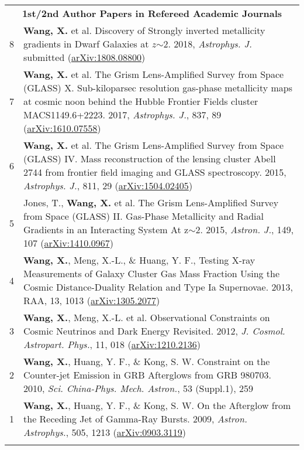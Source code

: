 \documentclass[letterpaper,12pt]{article}
\begin{document}
\begingroup
\renewcommand\arraystretch{1.2}
\vspace*{-.5em}
\begin{longtable}{rp{5.8in}}

\multicolumn{2}{c}{\textbf{1st/2nd Author Papers in Refereed Academic Journals}}      \\

8 &  \textbf{Wang, X.} et al. Discovery of Strongly inverted metallicity gradients in Dwarf Galaxies at $z$$\sim$2. 2018, \textit{Astrophys. J.} submitted (\href{https://arxiv.org/abs/1808.08800}{arXiv:1808.08800})  \\
7 &  \textbf{Wang, X.} et al. The Grism Lens-Amplified Survey from Space (GLASS) X. Sub-kiloparsec resolution gas-phase metallicity maps at cosmic noon behind the Hubble Frontier Fields cluster MACS1149.6+2223. 2017, \textit{Astrophys. J.}, 837, 89 (\href{http://arxiv.org/abs/1610.07558}{arXiv:1610.07558})     \\
6 &  \textbf{Wang, X.} et al. The Grism Lens-Amplified Survey from Space (GLASS) IV. Mass reconstruction of the lensing cluster Abell 2744 from frontier field imaging and GLASS spectroscopy. 2015, \textit{Astrophys. J.}, 811, 29 (\href{http://arxiv.org/abs/1504.02405}{arXiv:1504.02405})  \\
5 &  Jones, T., \textbf{Wang, X.} et al. The Grism Lens-Amplified Survey from Space (GLASS) II. Gas-Phase Metallicity and Radial Gradients in an Interacting System At z$\sim$2. 2015, \textit{Astron. J.}, 149, 107 (\href{http://arxiv.org/abs/1410.0967}{arXiv:1410.0967})    \\
4 &  \textbf{Wang, X.}, Meng, X.-L., \& Huang, Y. F., Testing X-ray Measurements of Galaxy Cluster Gas Mass Fraction Using the Cosmic Distance-Duality Relation and Type Ia Supernovae. 2013, RAA, 13, 1013 (\href{http://arxiv.org/abs/1305.2077}{arXiv:1305.2077})  \\
3 &  \textbf{Wang, X.}, Meng, X.-L. et al. Observational Constraints on Cosmic Neutrinos and Dark Energy Revisited. 2012, \textit{J. Cosmol. Astropart. Phys.}, 11, 018 (\href{http://arxiv.org/abs/1210.2136}{arXiv:1210.2136})  \\
2 &  \textbf{Wang, X.}, Huang, Y. F., \& Kong, S. W. Constraint on the Counter-jet Emission in GRB Afterglows from GRB 980703. 2010, \textit{Sci. China-Phys. Mech. Astron.}, 53 (Suppl.1), 259     \\
1 &  \textbf{Wang, X.}, Huang, Y. F., \& Kong, S. W. On the Afterglow from the Receding Jet of Gamma-Ray Bursts. 2009, \textit{Astron. Astrophys.}, 505, 1213 (\href{http://arxiv.org/abs/0903.3119}{arXiv:0903.3119})    \\
$$
\end{longtable}
\end{document}
